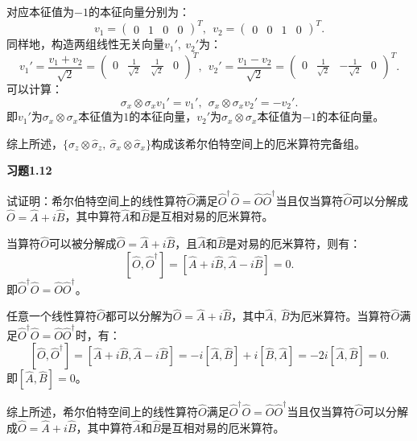 \documentclass[reqno,a4paper,12pt]{amsart}
\begin{document}
\begin{tcolorbox}[breakable, colback = black!5!white, colframe = black]
对应本征值为$-1$的本征向量分别为：
\[
	v_1 = (\begin{matrix}
		0 & 1 & 0 & 0
	\end{matrix})^T, ~~
	v_2 = (\begin{matrix}
		0 & 0 & 1 & 0
	\end{matrix})^T.
\]
同样地，构造两组线性无关向量$v_1',~v_2'$为：
\[
	v_1' = \frac{v_1+v_2}{\sqrt{2}} = (\begin{matrix}
		0 & \frac{1}{\sqrt{2}} & \frac{1}{\sqrt{2}} & 0
	\end{matrix})^T, ~~
	v_2' = \frac{v_1-v_2}{\sqrt{2}} = (\begin{matrix}
		0 & \frac{1}{\sqrt{2}} & -\frac{1}{\sqrt{2}} & 0
	\end{matrix})^T.
\]
可以计算：
\[
	\sigma_x\otimes\sigma_x v_1' = v_1', ~~ \sigma_x\otimes\sigma_x v_2' = -v_2'.
\]
即$v_1'$为$\sigma_x\otimes\sigma_x$本征值为$1$的本征向量，$v_2'$为$\sigma_x\otimes\sigma_x$本征值为$-1$的本征向量。

综上所述，$\{ \hat{\sigma}_z\otimes\hat{\sigma}_z, ~ \hat{\sigma}_x\otimes\hat{\sigma}_x \}$构成该希尔伯特空间上的厄米算符完备组。
\end{tcolorbox}

\textbf{习题1.12}

试证明：希尔伯特空间上的线性算符$\hat{O}$满足$\hat{O}^\dagger\hat{O} = \hat{O}\hat{O}^\dagger$当且仅当算符$\hat{O}$可以分解成$\hat{O}=\hat{A}+i\hat{B}$，其中算符$\hat{A}$和$\hat{B}$是互相对易的厄米算符。
\begin{tcolorbox}[breakable, colback = black!5!white, colframe = black]
当算符$\hat{O}$可以被分解成$\hat{O} = \hat{A}+i\hat{B}$，且$\hat{A}$和$\hat{B}$是对易的厄米算符，则有：
\[
	[\hat{O}, \hat{O}^\dagger] = [\hat{A}+i\hat{B}, \hat{A}-i\hat{B}] = 0.
\]
即$\hat{O}^\dagger\hat{O} = \hat{O}\hat{O}^\dagger$。

任意一个线性算符$\hat{O}$都可以分解为$\hat{O} = \hat{A} + i\hat{B}$，其中$\hat{A}, ~ \hat{B}$为厄米算符。当算符$\hat{O}$满足$\hat{O}^\dagger\hat{O} = \hat{O}\hat{O}^\dagger$时，有：
\[
	[\hat{O}, \hat{O}^\dagger] = [\hat{A}+i\hat{B}, \hat{A}-i\hat{B}] = -i[\hat{A}, \hat{B}] + i[\hat{B}, \hat{A}] = -2i[\hat{A}, \hat{B}] = 0.
\]
即$[\hat{A}, \hat{B}] = 0$。

综上所述，希尔伯特空间上的线性算符$\hat{O}$满足$\hat{O}^\dagger\hat{O} = \hat{O}\hat{O}^\dagger$当且仅当算符$\hat{O}$可以分解成$\hat{O}=\hat{A}+i\hat{B}$，其中算符$\hat{A}$和$\hat{B}$是互相对易的厄米算符。
\end{tcolorbox}
\end{document}
